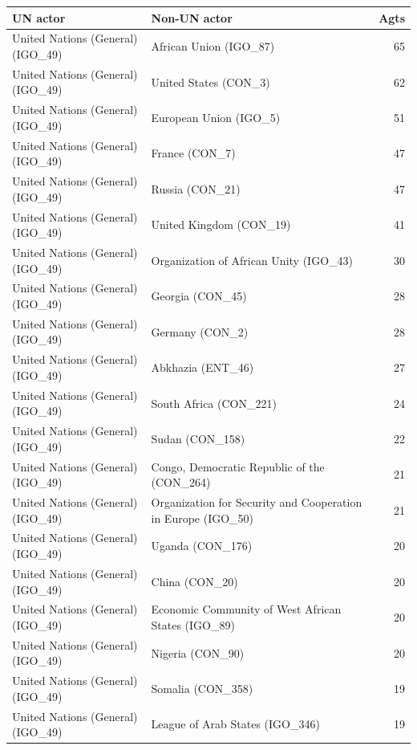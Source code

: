 \documentclass{article}
\begin{document}
\begin{table}[H]
\begin{center}
\small
\begin{tabularx}{\textwidth}{|X|X|r|}
    \hline
    \textbf{UN actor} & \textbf{Non-UN actor} & \textbf{Agts} \\
    \hline
    \hline
United Nations (General) (IGO\_49) & African Union (IGO\_87) & 65 \\
\hline
United Nations (General) (IGO\_49) & United States (CON\_3) & 62 \\
\hline
United Nations (General) (IGO\_49) & European Union (IGO\_5) & 51 \\
\hline
United Nations (General) (IGO\_49) & France (CON\_7) & 47 \\
\hline
United Nations (General) (IGO\_49) & Russia (CON\_21) & 47 \\
\hline
United Nations (General) (IGO\_49) & United Kingdom (CON\_19) & 41 \\
\hline
United Nations (General) (IGO\_49) & Organization of African Unity (IGO\_43) & 30 \\
\hline
United Nations (General) (IGO\_49) & Georgia (CON\_45) & 28 \\
\hline
United Nations (General) (IGO\_49) & Germany (CON\_2) & 28 \\
\hline
United Nations (General) (IGO\_49) & Abkhazia (ENT\_46) & 27 \\
\hline
United Nations (General) (IGO\_49) & South Africa (CON\_221) & 24 \\
\hline
United Nations (General) (IGO\_49) & Sudan (CON\_158) & 22 \\
\hline
United Nations (General) (IGO\_49) & Congo, Democratic Republic of the (CON\_264) & 21 \\
\hline
United Nations (General) (IGO\_49) & Organization for Security and Cooperation in Europe (IGO\_50) & 21 \\
\hline
United Nations (General) (IGO\_49) & Uganda (CON\_176) & 20 \\
\hline
United Nations (General) (IGO\_49) & China (CON\_20) & 20 \\
\hline
United Nations (General) (IGO\_49) & Economic Community of West African States (IGO\_89) & 20 \\
\hline
United Nations (General) (IGO\_49) & Nigeria (CON\_90) & 20 \\
\hline
United Nations (General) (IGO\_49) & Somalia (CON\_358) & 19 \\
\hline
United Nations (General) (IGO\_49) & League of Arab States (IGO\_346) & 19 \\

\end{tabularx}
\end{center}
\end{table}
\end{document}
